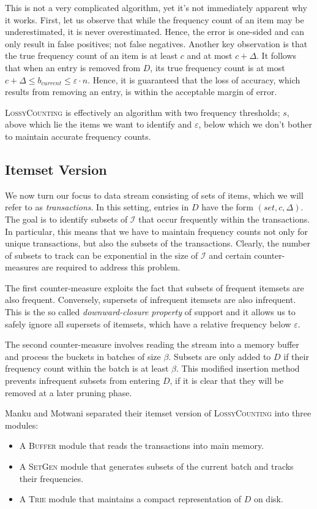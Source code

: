 \documentclass[a4paper]{article}
\begin{document}
This is not a very complicated algorithm, yet it's not immediately apparent why it works. First, let us observe that while the frequency count of an item may be underestimated, it is never overestimated. Hence, the error is one-sided and can only result in false positives; not false negatives. Another key observation is that the true frequency count of an item is at least $c$ and at most $c + \Delta$. It follows that when an entry is removed from $D$, its true frequency count is at most $c + \Delta \leq b_{current} \leq \varepsilon \cdot n$. Hence, it is guaranteed that the loss of accuracy, which results from removing an entry, is within the acceptable margin of error.

\textsc{LossyCounting} is effectively an algorithm with two frequency thresholds; $s$, above which lie the items we want to identify and $\varepsilon$, below which we don't bother to maintain accurate frequency counts.

\subsection{Itemset Version}
We now turn our focus to data stream consisting of sets of items, which we will refer to as \textit{transactions}. In this setting, entries in $D$ have the form $(set, c, \Delta)$. The goal is to identify subsets of $\mathcal{I}$ that occur frequently within the transactions. In particular, this means that we have to maintain frequency counts not only for unique transactions, but also the subsets of the transactions. Clearly, the number of subsets to track can be exponential in the size of $\mathcal{I}$ and certain counter-measures are required to address this problem.

The first counter-measure exploits the fact that subsets of frequent itemsets are also frequent. Conversely, supersets of infrequent itemsets are also infrequent. This is the so called \textit{downward-closure property} of support and it allows us to safely ignore all supersets of itemsets, which have a relative frequency below $\varepsilon$.

The second counter-measure involves reading the stream into a memory buffer and process the buckets in batches of size $\beta$. Subsets are only added to $D$ if their frequency count within the batch is at least $\beta$. This modified insertion method prevents infrequent subsets from entering $D$, if it is clear that they will be removed at a later pruning phase.

Manku and Motwani separated their itemset version of \textsc{LossyCounting} into three modules:
\begin{itemize}
\item A \textsc{Buffer} module that reads the transactions into main memory.
\item A \textsc{SetGen} module that generates subsets of the current batch and tracks their frequencies.
\item A \textsc{Trie} module that maintains a compact representation of $D$ on disk.
\end{itemize}
\end{document}
